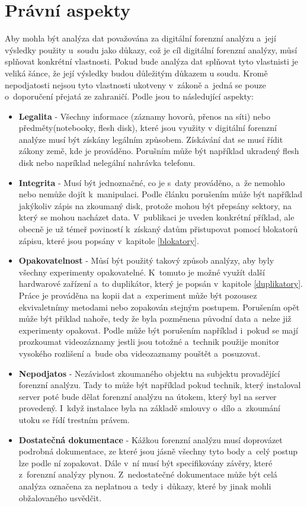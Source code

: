 \documentclass[thesis=B,czech]{FITthesis}[2012/06/26]
\begin{document}
\section{Právní aspekty}

Aby mohla být analýza dat považována za digitální forenzní analýzu a~její výsledky použity u~soudu jako důkazy, což je cíl digitální forenzní analýzy, můsí splňovat konkrétní vlastnosti. Pokud bude analýza dat splňovat tyto vlastnisti je veliká šánce, že její výsledky budou důležitým důkazem u soudu. Kromě nepodjatosti nejsou tyto vlastnosti ukotveny v~zákoně a~jedná se pouze o~doporučení přejatá ze zahraničí. Podle \cite{svetlik2010digitalni} jsou to následující aspekty:

\begin{itemize}

\item \textbf{Legalita} - Všechny informace (záznamy hovorů, přenos na síti) nebo předměty(notebooky, flesh disk), které jsou využity v digitální forenzní analýze musí být získány legálním způsobem. Získávání dat se musí řídit zákony země, kde je prováděno. Porušním může být například ukradený flesh disk nebo napríklad nelegální nahrávka telefonu. 
\item \textbf{Integrita} - Musí být jednoznačné, co je s~daty prováděno, a~že nemohlo nebo nemůže dojít k~manipulaci. Podle článku \cite{svetlik2010digitalni} porušením může být například jakýkoliv zápis na zkoumaný disk, protože mohou být přepsány sektory, na který se mohou nacházet data. V~publikaci je uveden konkrétní příklad, ale obecně je už témeř poviností k~získaný datům přistupovat pomocí blokatorů zápisu, které jsou popsány v~kapitole \ref{blokatory}.
\item \textbf{Opakovatelnost} - Můsí být použitý takový způsob analýzy, aby byly všechny experimenty opakovatelné. K~tomuto je možné využít další hardwarové zařízení a~to duplikátor, který je popsán v~kapitole \ref{duplikatory}. Práce je prováděna na kopii dat a~experiment může být pozousez ekvivaletnímy metodami nebo zopakován stejným postupem. Porušením opět může být přiklad nahoře, tedy že byla pozměnena původní data a~nelze již experimenty opakovat. Podle \cite{svetlik2010digitalni} může být porušením například i~pokud se mají prozkoumat videozáznamy jestli jsou totožné a~technik použije monitor vysokého rozlišení a~bude oba videozaznamy pouštět a~posuzovat. 
\item \textbf{Nepodjatos} - Nezávislost zkoumaného objektu na subjektu provadějící forenzní analýzu. Tady to může být například pokud technik, který instaloval server poté bude dělat forenzní analýzu na útokem, který byl na server provedený. I~když instalace byla na základě smlouvy o~dílo a~zkoumání utoku se řídí trestním právem. 
\item \textbf{Dostatečná dokumentace} - Kážkou forenzní analýzu musí doprovázet podrobná dokumentace, ze které jsou jásně všechny tyto body a~celý postup lze podle ní zopakovat. Dále v~ní musí být specifikovány závěry, které z~forenzní analýzy plynou. Z~nedostatečné dokumentace může být celá analýza označena za neplatnou a~tedy i~důkazy, které by jinak mohli obžalovaného usvědčit.

\end{itemize}
\end{document}
